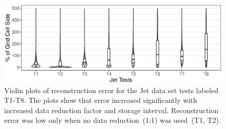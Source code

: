 \begin{figure}[!b]
\centering
\includegraphics[width=\linewidth]{Images/Jet_Tests.eps}
\caption{{Violin plots of reconstruction error for the Jet data set tests labeled T1-T8. The plots show that error increased significantly with increased data reduction factor and storage interval. Reconstruction error was low only when no data reduction~(1:1) was used~(T1, T2).}}
\vspace{-2mm}
\label{fig:jet_plot}
\end{figure}
